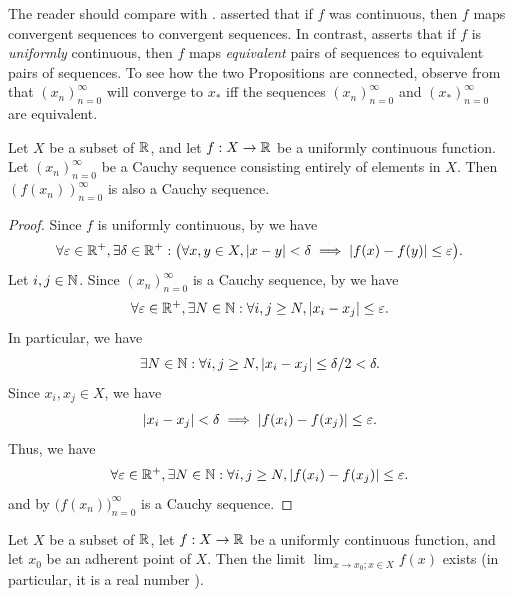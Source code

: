 \begin{rmk}\label{i:9.9.9}
  The reader should compare  with .
   asserted that if \(f\) was continuous, then \(f\) maps convergent sequences to convergent sequences.
  In contrast,  asserts that if \(f\) is \emph{uniformly} continuous, then \(f\) maps \emph{equivalent} pairs of sequences to equivalent pairs of sequences.
  To see how the two Propositions are connected, observe from  that \((x_n)_{n = 0}^\infty\) will converge to \(x_*\) iff the sequences \((x_n)_{n = 0}^\infty\) and \((x_*)_{n = 0}^\infty\) are equivalent.
\end{rmk}

\setcounter{thm}{11}
\begin{prop}\label{i:9.9.12}
  Let \(X\) be a subset of \(\mathbb{R}\), and let \(f : X \to \mathbb{R}\) be a uniformly continuous function.
  Let \((x_n)_{n = 0}^\infty\) be a Cauchy sequence consisting entirely of elements in \(X\).
  Then \((f(x_n))_{n = 0}^\infty\) is also a Cauchy sequence.
\end{prop}

\begin{proof}
  Since \(f\) is uniformly continuous, by  we have
  \[
    \forall \varepsilon \in \mathbb{R}^+, \exists \delta \in \mathbb{R}^+ : \big(\forall x, y \in X, \left\lvert x - y\right\rvert < \delta \implies \left\lvert f(x) - f(y)\right\rvert \leq \varepsilon\big).
  \]
  Let \(i, j \in \mathbb{N}\).
  Since \((x_n)_{n = 0}^\infty\) is a Cauchy sequence, by  we have
  \[
    \forall \varepsilon \in \mathbb{R}^+, \exists N \in \mathbb{N} : \forall i, j \geq N, \left\lvert x_i - x_j\right\rvert \leq \varepsilon.
  \]
  In particular, we have
  \[
    \exists N \in \mathbb{N} : \forall i, j \geq N, \left\lvert x_i - x_j\right\rvert \leq \delta / 2 < \delta.
  \]
  Since \(x_i, x_j \in X\), we have
  \[
    \left\lvert x_i - x_j\right\rvert < \delta \implies \left\lvert f(x_i) - f(x_j)\right\rvert \leq \varepsilon.
  \]
  Thus, we have
  \[
    \forall \varepsilon \in \mathbb{R}^+, \exists N \in \mathbb{N} : \forall i, j \geq N, \left\lvert f(x_i) - f(x_j)\right\rvert \leq \varepsilon.
  \]
  and by  \(\big(f(x_n)\big)_{n = 0}^\infty\) is a Cauchy sequence.
\end{proof}

\setcounter{thm}{13}
\begin{cor}\label{i:9.9.14}
  Let \(X\) be a subset of \(\mathbb{R}\), let \(f : X \to \mathbb{R}\) be a uniformly continuous function, and let \(x_0\) be an adherent point of \(X\).
  Then the limit \(\lim_{x \to x_0 ; x \in X} f(x)\) exists
  (in particular, it is a real number ).
\end{cor}

